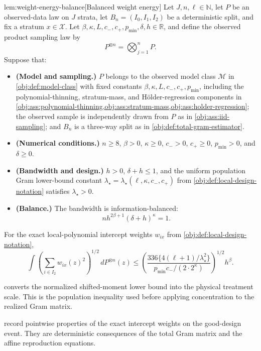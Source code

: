 \begin{lemmav}{lem:weight-energy-balance}[Balanced weight energy]
Let \(J,n,\ell\in\mathbb N\), let \(P\) be an observed-data law on \(J\) strata, let \(B_n=(I_0,I_1,I_2)\) be a deterministic split, and fix a stratum \(x\in\mathcal X\).  Let \(\beta,\kappa,L,c_-,c_+,p_{\min},\delta,h\in\mathbb R\), and define the observed product sampling law by
\[
P^{\otimes n}=\bigotimes_{j=1}^n P .
\]
Suppose that:
\begin{itemize}
\item \textbf{(Model and sampling.)} \(P\) belongs to the observed model class \(\mathcal M\) in \cref{obj:def:model-class} with fixed constants \(\beta,\kappa,L,c_-,c_+,p_{\min}\), including the polynomial-thinning, stratum-mass, and Hölder-regression components in \cref{obj:ass:polynomial-thinning,obj:ass:stratum-mass,obj:ass:holder-regression}; the observed sample is independently drawn from \(P\) as in \cref{obj:ass:iid-sampling}; and \(B_n\) is a three-way split as in \cref{obj:def:total-gram-estimator}.
\item \textbf{(Numerical conditions.)} \(n\ge 8\), \(\beta>0\), \(\kappa\ge0\), \(c_->0\), \(c_+\ge0\), \(p_{\min}>0\), and \(\delta\ge0\).
\item \textbf{(Bandwidth and design.)} \(h>0\), \(\delta+h\le1\), and the uniform population Gram lower-bound constant \(\lambda_\star=\lambda_\star(\ell,\kappa,c_-,c_+)\) from \cref{obj:def:local-design-notation} satisfies \(\lambda_\star>0\).
\item \textbf{(Balance.)} The bandwidth is information-balanced:
\[
n h^{2\beta+1}(\delta+h)^\kappa=1.
\]
\end{itemize}
For the exact local-polynomial intercept weights \(w_{ix}\) from \cref{obj:def:local-design-notation},
\[
\int
\left(\sum_{i\in I_2} w_{ix}(z)^2\right)^{1/2}
\,dP^{\otimes n}(z)
\le
\left(
\frac{336\{4(\ell+1)/\lambda_\star^2\}}
{p_{\min}c_-/(2\cdot 2^\kappa)}
\right)^{1/2}
h^\beta .
\]
\end{lemmav}

 converts the normalized shifted-moment lower bound into the physical treatment scale. This is the population inequality used before applying concentration to the realized Gram matrix.

 record pointwise properties of the exact intercept weights on the good-design event. They are deterministic consequences of the total Gram matrix and the affine reproduction equations.


